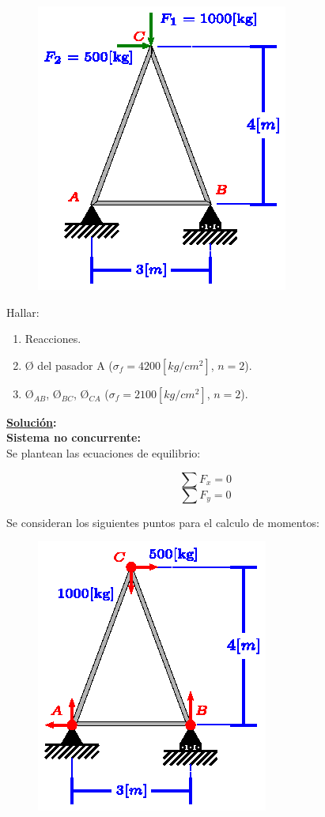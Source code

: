 \documentclass[letter,10pt,twoside]{article}
\begin{document}
\begin{figure}[H]
\centering
\includegraphics[scale=1.8]{resources/f04.eps}
\end{figure}

Hallar:
\begin{enumerate}
    \item Reacciones.
    \item {\O} del pasador A ($\sigma_f=4200[kg/cm^2]$, $n=2$).
    \item $\text{\O}_{AB}$, $\text{\O}_{BC}$, $\text{\O}_{CA}$ ($\sigma_f=2100[kg/cm^2]$, $n=2$).
\end{enumerate}

\textbf{\underline{Solución}:} \\

\textbf{Sistema no concurrente:} \\
Se plantean las ecuaciones de equilibrio:

\begin{equation*}
    \sum{F_x} = 0
\end{equation*}
\begin{equation*}
    \sum{F_y} = 0
\end{equation*}

Se consideran los siguientes puntos para el calculo de momentos:

\begin{figure}[H]
\centering
\includegraphics[scale=1.8]{resources/g04.eps}
\end{figure}
\end{document}
